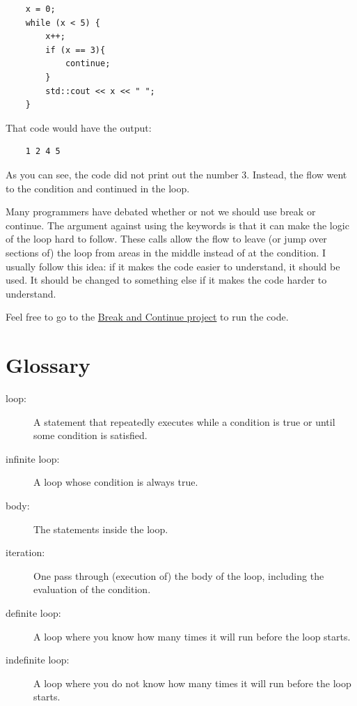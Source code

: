 \begin{lstlisting}
    x = 0;
    while (x < 5) {
        x++;
        if (x == 3){
            continue;
        }
        std::cout << x << " ";
    }
\end{lstlisting}
That code would have the output:
\begin{verbatim}
    1 2 4 5 
\end{verbatim}
As you can see, the code did not print out
the number 3. Instead, the flow went to the 
condition and continued in the loop.

Many programmers have debated whether or not we should use break or continue. The argument against using the keywords is that it can make the logic of the loop hard to follow. These calls allow the flow to leave (or jump over sections of) the loop from areas in the middle instead of at the condition. 
I usually follow this idea: if it makes the code easier to understand, it should be used. It should be changed to something else if it makes the code harder to understand.

Feel free to go to the  \href{https://replit.com/@lpatacch/break-and-continue#breakandcontinue.cpp}{Break and Continue project} to run the code.
\section{Glossary}

\begin{description}

\item[loop:]  A statement that repeatedly executes while a
condition is true or until some condition is satisfied.

\item[infinite loop:]  A loop whose condition is always true.

\item[body:]  The statements inside the loop.

\item[iteration:]  One pass through (execution of) the body
of the loop, including the evaluation of the condition.

\item[definite loop:]  A loop where you know how many times
it will run before the loop starts.

\item[indefinite loop:]  A loop where you do not know how many
times it will run before the loop starts.




\end{description}

